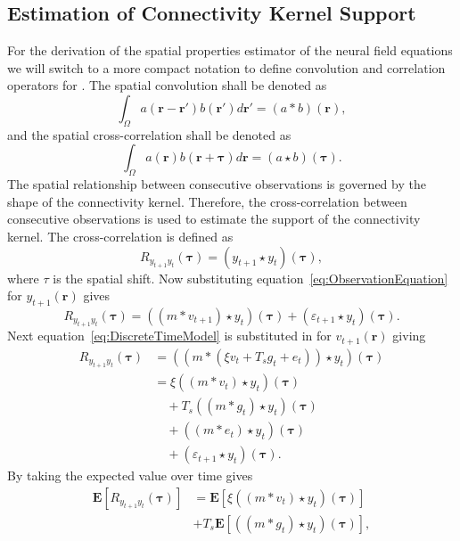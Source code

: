 \documentclass[conference]{IEEEtran}
\begin{document}
\subsection{Estimation of Connectivity Kernel Support}
For the derivation of the spatial properties estimator of the neural field equations we will switch to a more compact notation to define convolution and correlation operators for . The spatial convolution shall be denoted as
\begin{equation}
	\int_\Omega a(\mathbf{r}-\mathbf{r}')b(\mathbf{r}')d\mathbf{r}' = (a\ast b)(\mathbf{r}),
\end{equation}
and the spatial cross-correlation shall be denoted as 
\begin{equation}
	\int_\Omega a(\mathbf{r})b(\mathbf{r}+\boldsymbol{\tau})d\mathbf{r} = (a\star b)(\boldsymbol{\tau}).
\end{equation} 
The spatial relationship between consecutive observations is governed by the shape of the connectivity kernel. Therefore, the cross-correlation between consecutive observations is used to estimate the support of the connectivity kernel. The cross-correlation is defined as
\begin{equation}
	R_{y_{t+1}y_t}(\boldsymbol{\tau}) = (y_{t+1}\star y_t)(\boldsymbol{\tau}),
\end{equation}
where $\tau$ is the spatial shift. Now substituting equation~\ref{eq:ObservationEquation} for $y_{t+1}(\mathbf{r})$ gives 
\begin{equation}
	R_{y_{t+1}y_t}(\boldsymbol{\tau}) = ((m \ast v_{t+1})\star y_t)(\boldsymbol{\tau}) + (\varepsilon_{t+1} \star y_t)(\boldsymbol{\tau}).
\end{equation}
Next equation~\ref{eq:DiscreteTimeModel} is substituted in for $v_{t+1}(\mathbf{r})$ giving 
\begin{align}
	R_{y_{t+1}y_t}(\boldsymbol{\tau}) &= (\left(m \ast \left(\xi v_t +  T_s g_t + e_t\right)\right) \star y_t)(\boldsymbol{\tau})\\
	&= \xi\left(\left(m \ast v_t\right) \star y_t \right)(\boldsymbol{\tau}) \nonumber\\
	&\quad+ T_s \left(\left(m\ast g_t\right)\star y_t \right)(\boldsymbol{\tau}) \nonumber\\
	&\quad+ \left(\left(m\ast e_t\right)\star y_t \right)(\boldsymbol{\tau}) \nonumber\\
	&\quad+ (\varepsilon_{t+1} \star y_t)(\boldsymbol{\tau}).
\end{align}
By taking the expected value over time gives
\begin{align}
	\mathbf{E}[R_{y_{t+1}y_t}(\boldsymbol{\tau})] &= \mathbf{E}[\xi\left(\left(m \ast v_t\right) \star y_t \right)(\boldsymbol{\tau})] \nonumber \\
	 &+ T_s \mathbf{E}[\left(\left(m\ast g_t\right)\star y_t \right)(\boldsymbol{\tau})],
\end{align}
\end{document}
